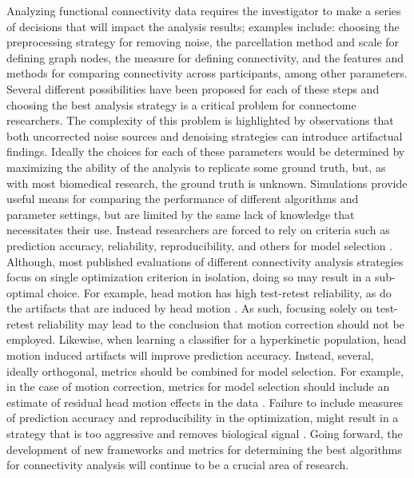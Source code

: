 \documentclass{bmcart}
\begin{document}
Analyzing functional connectivity data requires the investigator to make a series of decisions that will impact the analysis results; examples include: choosing the preprocessing strategy for removing noise, the parcellation method and scale for defining graph nodes, the measure for defining connectivity, and the features and methods for comparing connectivity across participants, among other parameters. Several different possibilities have been proposed for each of these steps and choosing the best analysis strategy is a critical problem for connectome researchers. The complexity of this problem is highlighted by observations that both uncorrected noise sources \cite{Birn2012, Power2012, VanDijk2012, yan2013comprehensive, satterthwaite2012impact} and denoising strategies \cite{Murphy2009, Saad2012} can introduce artifactual findings. Ideally the choices for each of these parameters would be determined by maximizing the ability of the analysis to replicate some ground truth, but, as with most biomedical research, the ground truth is unknown. Simulations provide useful means for comparing the performance of different algorithms and parameter settings, but are limited by the same lack of knowledge that necessitates their use. Instead researchers are forced to rely on criteria such as prediction accuracy, reliability, reproducibility, and others for model selection \cite{strother2006}. Although, most published evaluations of different connectivity analysis strategies focus on single optimization criterion in isolation, doing so may result in a sub-optimal choice. For example, head motion has high test-retest reliability, as do the artifacts that are induced by head motion \cite{yan2013comprehensive}. As such, focusing solely on test-retest reliability may lead to the conclusion that motion correction should not be employed. Likewise, when learning a classifier for a hyperkinetic population, head motion induced artifacts will improve prediction accuracy\cite{satterthwaite2012improved}. Instead, several, ideally orthogonal, metrics should be combined for model selection.  For example, in the case of motion correction, metrics for model selection should include an estimate of residual head motion effects in the data \cite{Power2012, VanDijk2012, yan2013comprehensive, satterthwaite2012impact}. Failure to include measures of prediction accuracy and reproducibility in the optimization, might result in a strategy that is too aggressive and removes biological signal \cite{laconte2003evaluation, strother2002quantitative}. Going forward, the development of new frameworks and metrics for determining the best algorithms for connectivity analysis will continue to be a crucial area of research. 
\end{document}
